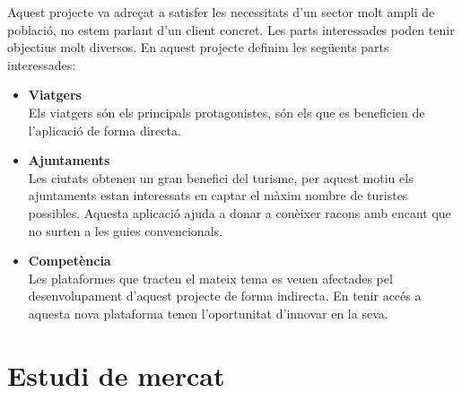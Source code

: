 Aquest projecte va adreçat a satisfer les necessitats d’un sector molt ampli de població, no estem parlant d’un client concret. Les parts interessades poden tenir objectius molt diversos. En aquest projecte definim les següents parts interessades:
\begin{itemize}

\item\textbf{Viatgers}\\
Els viatgers són els principals protagonistes, són els que es beneficien de l’aplicació de forma directa.

\item\textbf{Ajuntaments}\\
Les ciutats obtenen un gran benefici del turisme, per aquest motiu els ajuntaments estan interessats en captar el màxim nombre de turistes possibles. Aquesta aplicació ajuda a donar a conèixer racons amb encant que no surten a les guies convencionals.

\item\textbf{Competència}\\
Les plataformes que tracten el mateix tema es veuen afectades pel desenvolupament d’aquest projecte de forma indirecta. En tenir accés a aquesta nova plataforma tenen l’oportunitat d’innovar en la seva.

\end{itemize}
\section{Estudi de mercat}

